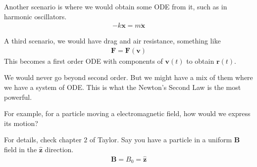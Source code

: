 \documentclass[12pt]{article}
\newcommand{\unz}{\hat{\mathbf{z}}}
\begin{document}
    Another scenario is where we would obtain some ODE from it, such as in harmonic oscillators. 
        \begin{align}
        -k\mathbf{x} = m\ddot{\mathbf{x}}
        \end{align}

    A third scenario, we would have drag and air resistance, something like
    \begin{align}
    \mathbf{F} = \mathbf{F}(\mathbf{v})
    \end{align}
    This becomes a first order ODE with components of $\mathbf{v}(t)$ to obtain $\mathbf{r}(t)$.

    We would never go beyond second order. But we might have a mix of them where we have a system of ODE. This is what the Newton's Second Law is the most powerful. 

    For example, for a particle moving a electromagnetic field, how would we express its motion?

    For details, check chapter $2$ of Taylor. Say you have a particle in a uniform \textbf{B} field in the $\unz$ direction. 
    \begin{align}
    \mathbf{B} = B_0 = \unz
    \end{align}
\end{document}

